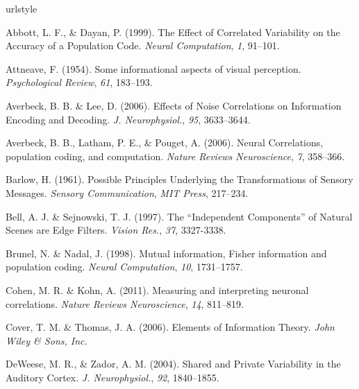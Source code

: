 \documentclass[12pt]{article}
\begin{document}
\newpage
\begin{thebibliography}{100}
\providecommand{\natexlab}[1]{#1}
\expandafter\ifx\csname urlstyle\endcsname\relax
  \providecommand{\doi}[1]{doi:\discretionary{}{}{}#1}\else
  \providecommand{\doi}{doi:\discretionary{}{}{}\begingroup
  \urlstyle{rm}\Url}\fi


Abbott, L. F., \& Dayan, P. (1999).
\newblock The Effect of Correlated Variability on the Accuracy of a Population Code.
\newblock \emph{Neural Computation}, \emph{1}, 91--101.

Attneave, F. (1954).
\newblock Some informational aspects of visual perception.
\newblock \emph{Psychological Review}, \emph{61}, 183--193.

Averbeck, B. B. \& Lee, D. (2006).
Effects of Noise Correlations on Information Encoding and Decoding.
\newblock \emph{J. Neurophysiol.}, \emph{95}, 3633--3644.

Averbeck, B. B., Latham, P. E., \& Pouget, A. (2006).
\newblock Neural Correlations, population coding, and computation.
\newblock \emph{Nature Reviews Neuroscience}, \emph{7}, 358--366.

Barlow, H. (1961).
\newblock Possible Principles Underlying the Transformations of Sensory Messages.
\newblock \emph{Sensory Communication}, \emph{MIT Press}, 217--234.

Bell, A. J. \& Sejnowski, T. J. (1997).
\newblock The ``Independent Components'' of Natural Scenes are Edge Filters.
\newblock \emph{Vision Res.}, \emph{37}, 3327-3338.

Brunel, N. \& Nadal, J. (1998).
\newblock Mutual information, Fisher information and population coding.
\newblock \emph{Neural Computation}, \emph{10}, 1731--1757.

Cohen, M. R. \& Kohn, A. (2011).
\newblock Measuring and interpreting neuronal correlations.
\newblock \emph{Nature Reviews Neuroscience}, \emph{14}, 811--819.

Cover, T. M. \& Thomas, J. A. (2006).
\newblock Elements of Information Theory.
\newblock \emph{John Wiley \& Sons, Inc.}

DeWeese, M. R., \& Zador, A. M. (2004).
\newblock Shared and Private Variability in the Auditory Cortex.
\newblock \emph{J. Neurophysiol.}, \emph{92}, 1840--1855.


\end{thebibliography}
\end{document}
